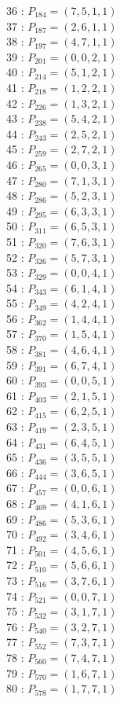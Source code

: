 \documentclass{article}
\begin{document}
{\begin{multicols}{3}
36 : $P_{184}=( 7, 5, 1, 1 )$\\
37 : $P_{187}=( 2, 6, 1, 1 )$\\
38 : $P_{197}=( 4, 7, 1, 1 )$\\
39 : $P_{201}=( 0, 0, 2, 1 )$\\
40 : $P_{214}=( 5, 1, 2, 1 )$\\
41 : $P_{218}=( 1, 2, 2, 1 )$\\
42 : $P_{226}=( 1, 3, 2, 1 )$\\
43 : $P_{238}=( 5, 4, 2, 1 )$\\
44 : $P_{243}=( 2, 5, 2, 1 )$\\
45 : $P_{259}=( 2, 7, 2, 1 )$\\
46 : $P_{265}=( 0, 0, 3, 1 )$\\
47 : $P_{280}=( 7, 1, 3, 1 )$\\
48 : $P_{286}=( 5, 2, 3, 1 )$\\
49 : $P_{295}=( 6, 3, 3, 1 )$\\
50 : $P_{311}=( 6, 5, 3, 1 )$\\
51 : $P_{320}=( 7, 6, 3, 1 )$\\
52 : $P_{326}=( 5, 7, 3, 1 )$\\
53 : $P_{329}=( 0, 0, 4, 1 )$\\
54 : $P_{343}=( 6, 1, 4, 1 )$\\
55 : $P_{349}=( 4, 2, 4, 1 )$\\
56 : $P_{362}=( 1, 4, 4, 1 )$\\
57 : $P_{370}=( 1, 5, 4, 1 )$\\
58 : $P_{381}=( 4, 6, 4, 1 )$\\
59 : $P_{391}=( 6, 7, 4, 1 )$\\
60 : $P_{393}=( 0, 0, 5, 1 )$\\
61 : $P_{403}=( 2, 1, 5, 1 )$\\
62 : $P_{415}=( 6, 2, 5, 1 )$\\
63 : $P_{419}=( 2, 3, 5, 1 )$\\
64 : $P_{431}=( 6, 4, 5, 1 )$\\
65 : $P_{436}=( 3, 5, 5, 1 )$\\
66 : $P_{444}=( 3, 6, 5, 1 )$\\
67 : $P_{457}=( 0, 0, 6, 1 )$\\
68 : $P_{469}=( 4, 1, 6, 1 )$\\
69 : $P_{486}=( 5, 3, 6, 1 )$\\
70 : $P_{492}=( 3, 4, 6, 1 )$\\
71 : $P_{501}=( 4, 5, 6, 1 )$\\
72 : $P_{510}=( 5, 6, 6, 1 )$\\
73 : $P_{516}=( 3, 7, 6, 1 )$\\
74 : $P_{521}=( 0, 0, 7, 1 )$\\
75 : $P_{532}=( 3, 1, 7, 1 )$\\
76 : $P_{540}=( 3, 2, 7, 1 )$\\
77 : $P_{552}=( 7, 3, 7, 1 )$\\
78 : $P_{560}=( 7, 4, 7, 1 )$\\
79 : $P_{570}=( 1, 6, 7, 1 )$\\
80 : $P_{578}=( 1, 7, 7, 1 )$\\
\end{multicols}


}
\end{document}
